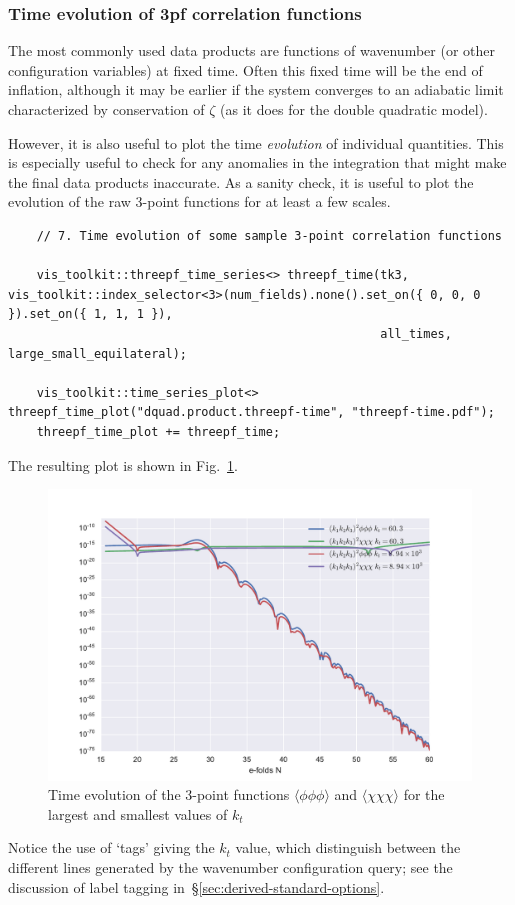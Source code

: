 \documentclass[11pt,a4paper]{article}
\begin{document}
\subsubsection{Time evolution of 3pf correlation functions}
The most commonly used data products
are functions of wavenumber (or other configuration variables)
at fixed time. Often this fixed time will be the end of inflation,
although it may be earlier if the system converges to an adiabatic
limit characterized by conservation of $\zeta$ (as it does for the double quadratic model).

However, it is also useful to plot the time \emph{evolution} of individual
quantities. This is especially useful to check for any anomalies in the integration
that might make the final data products inaccurate.
As a sanity check, it is useful to plot the evolution of the raw 3-point
functions for at least a few scales.
\begin{verbatim}
    // 7. Time evolution of some sample 3-point correlation functions

    vis_toolkit::threepf_time_series<> threepf_time(tk3, vis_toolkit::index_selector<3>(num_fields).none().set_on({ 0, 0, 0 }).set_on({ 1, 1, 1 }),
                                                    all_times, large_small_equilateral);

    vis_toolkit::time_series_plot<> threepf_time_plot("dquad.product.threepf-time", "threepf-time.pdf");
    threepf_time_plot += threepf_time;    
\end{verbatim}
The resulting plot is shown in Fig.~\ref{fig:threepf-time}.
\begin{figure}
    \begin{center}
        \includegraphics[scale=0.75]{Outputs/threepf-time}    
    \end{center}
    \caption{\label{fig:threepf-time}Time evolution of the
    3-point functions $\langle \phi \phi \phi \rangle$
    and $\langle \chi \chi \chi \rangle$ for the largest and smallest values of $k_t$}
\end{figure}
Notice the use of `tags' giving the $k_t$ value, which distinguish between the
different lines generated by the wavenumber configuration query;
see the discussion of label tagging in~\S\ref{sec:derived-standard-options}.
\end{document}
